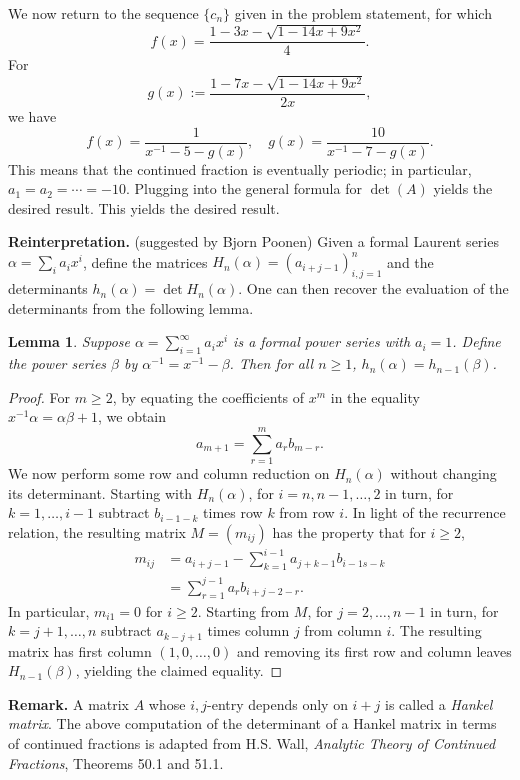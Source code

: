 \documentclass[amssymb,twocolumn,pra,10pt,aps]{revtex4-1}
\newtheorem*{lemma*}{Lemma}
\begin{document}
\begin{itemize}
We now return to the sequence $\{c_n\}$ given in the problem statement, for which
\[
f(x) = \frac{1 - 3x - \sqrt{1 - 14x +9x^{2}}}{4}.
\]
For 
\[
g(x) := \frac{1-7x-\sqrt{1-14x+9x^2}}{2x},
\]
we have
\[
f(x) = \frac{1}{x^{-1} - 5 - g(x)}, \quad
g(x) = \frac{10}{x^{-1} - 7 - g(x)}.
\]
This means that the continued fraction is eventually periodic;
in particular, $a_1 = a_2 = \cdots = -10$.
Plugging into the general formula for $\det(A)$ yields the desired result.
This yields the desired result.

\noindent
\textbf{Reinterpretation.} (suggested by Bjorn Poonen)
Given a formal Laurent series $\alpha = \sum_i a_i x^i$, define the matrices
$H_n(\alpha) = (a_{i+j-1})_{i,j=1}^n$ and the determinants $h_n(\alpha) = \det H_n(\alpha)$.
One can then recover the evaluation of the determinants from the following lemma.

\begin{lemma*}
Suppose $\alpha = \sum_{i=1}^\infty a_i x^i$ is a formal power series with $a_i = 1$.
Define the power series $\beta$ by $\alpha^{-1} = x^{-1} - \beta$. Then for all $n \geq 1$,
$h_n(\alpha) = h_{n-1}(\beta)$.
\end{lemma*}
\begin{proof}
For $m \geq 2$, by equating the coefficients of $x^m$ in the equality $x^{-1} \alpha = \alpha \beta + 1$, we obtain
\[
a_{m+1} = \sum_{r=1}^m a_r b_{m-r}.
\]
We now perform some row and column reduction on $H_n(\alpha)$ without changing its determinant.
Starting with $H_n(\alpha)$,
for $i = n,n-1,\dots,2$ in turn, for $k=1,\dots,i-1$ subtract $b_{i-1-k}$ times row $k$ from row $i$. In light of the recurrence relation, the resulting matrix $M = (m_{ij})$ has the property that for $i \geq 2$,
\begin{align*}
m_{ij} &= a_{i+j-1} - \sum_{k=1}^{i-1} a_{j+k-1} b_{i-1s-k} \\
&= \sum_{r=1}^{j-1}  a_r b_{i+j-2-r}.
\end{align*}
In particular, $m_{i1} = 0$ for $i \geq 2$.
Starting from $M$, for $j=2,\dots,n-1$ in turn, for $k=j+1,\dots,n$ subtract $a_{k-j+1}$ times column $j$ from column $i$. The resulting matrix has first column $(1, 0,\dots,0)$ and removing its first row and column leaves $H_{n-1}(\beta)$, yielding the claimed equality.
\end{proof}

\noindent
\textbf{Remark.} A matrix $A$ whose $i,j$-entry depends only on $i+j$ is called a \emph{Hankel matrix}.
The above computation of the determinant of a Hankel matrix in terms of continued fractions is adapted from
H.S. Wall, \textit{Analytic Theory of Continued Fractions}, Theorems 50.1 and 51.1.


\end{itemize}
\end{document}
